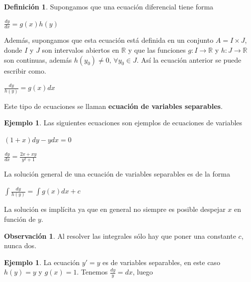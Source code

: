 \documentclass{article}
\theoremstyle{plain}
\theoremstyle{definition}
\newtheorem{defin}[thm]{Definición}
\newtheorem{ejem}[thm]{Ejemplo}
\newtheorem{rmk}[thm]{Observación}
\begin{document}
\begin{defin}Supongamos que una ecuación diferencial tiene forma
\end{defin}

\begin{center}
$\displaystyle \frac{dy}{dx}= g(x)h(y)$
\end{center}

Además, supongamos que esta ecuación está definida en un conjunto $A= I \times J$, donde $I$ y $J$ son intervalos abiertos en $\mathbb{R}$ y que las funciones $g:I \to \mathbb{R}$ y $h: J \to \mathbb{R}$ son continuas, además $h(y_0) \neq 0 \text{, } \forall y_0 \in J$. Así  la ecuación anterior se puede escribir como.

\begin{center}
$\displaystyle \frac{dy}{h(y)}= g(x)dx$
\end{center}

Este tipo de ecuaciones se llaman \textbf{ecuación de variables separables}. \\


\begin{ejem}Las siguientes ecuaciones son ejemplos de ecuaciones de variables
\end{ejem}


\begin{center}
$(1+x)dy-ydx=0$
\end{center}

\begin{center}
$\displaystyle \frac{dy}{dx}= \frac{2x+xy}{y^2+1}$
\end{center}


La solución general de una ecuación de variables separables es de la forma

\begin{center}
$\displaystyle \int \frac{dy}{h(y)} = \int g(x)dx +c$
\end{center}

La solución es implícita ya que en general no siempre es posible despejar $x$ en función de $y$. \\

\begin{rmk}Al resolver las integrales sólo hay que poner una constante $c$, nunca dos. \\
\end{rmk}


\begin{ejem}La ecuación $y'=y$ es de variables separables, en este caso $h(y)=y$ y $g(x)=1$. Tenemos $\displaystyle \frac{dy}{y}=dx$, luego
\end{ejem}
\end{document}
